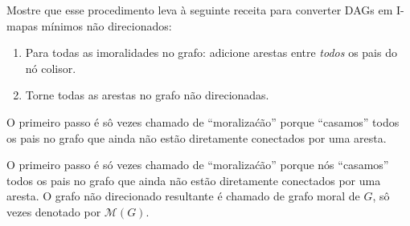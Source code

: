 Mostre que esse procedimento leva \`a seguinte receita para converter DAGs em I-mapas m\'inimos n\~ao direcionados:
\begin{enumerate}
    \item Para todas as imoralidades no grafo: adicione arestas entre \emph{todos} os pais do n\'o colisor.
    \item Torne todas as arestas no grafo n\~ao direcionadas.
\end{enumerate}
O primeiro passo \'e s\^o vezes chamado de ``moraliza\'c\~ao'' porque ``casamos'' todos os pais no grafo que ainda n\~ao est\~ao diretamente conectados por uma aresta.

O primeiro passo \'e s\'o vezes chamado de ``moraliza\'c\~ao'' porque n\'os ``casamos'' todos os pais no grafo que ainda n\~ao est\~ao diretamente conectados por uma aresta. O grafo n\~ao direcionado resultante \'e chamado de grafo moral de $G$, s\^o vezes denotado por $\mathcal{M}(G)$.

